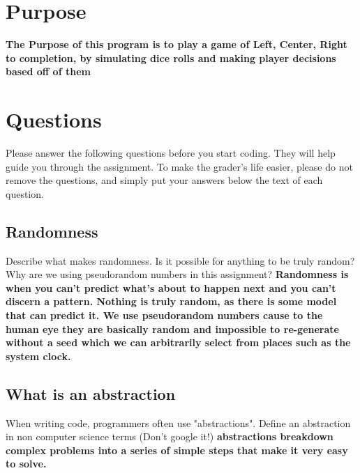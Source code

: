 \documentclass{article}
\title{\ASSIGNMENT}
\author{\NAME}
\date{\CLASS}
\begin{document}
\pagestyle{fancy}
\fancyfoot{}
\fancyhead{}
\fancyfoot[L]{\ASSIGNMENT\ -- \CLASS\ -- \NAME}
\fancyfoot[R]{\thepage}

\maketitle



\section*{Purpose}
\textbf{The Purpose of this program is to play a game of Left, Center, Right to completion, by simulating dice rolls and making player decisions based off of them}

\section{Questions}

Please answer the following questions before you start coding. They will help guide you through the assignment. To make the grader's life easier, please do not remove the questions, and simply put your answers below the text of each question. 

\subsection{Randomness}

Describe what makes randomness. Is it possible for anything to be truly random? Why are we using pseudorandom numbers in this assignment?\textbf{
Randomness is when you can't predict what's about to happen next and you can't discern a pattern. Nothing is truly random, as there is some model that can predict it. We use pseudorandom numbers cause to the human eye they are basically random and impossible to re-generate without a seed which we can arbitrarily select from places such as the system clock.}

\subsection{What is an abstraction}
When writing code, programmers often use "abstractions". Define an abstraction in non computer science terms (Don't google it!)
\textbf{
abstractions breakdown complex problems into a series of simple steps that make it very easy to solve.
}
\end{document}
